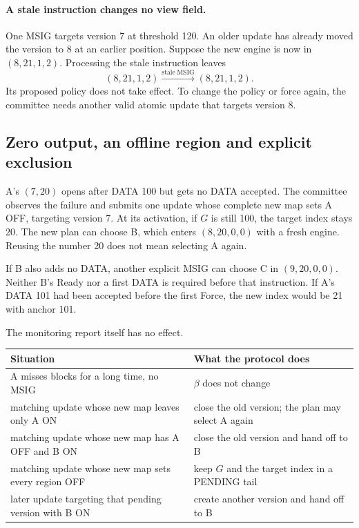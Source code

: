 \documentclass[11pt,a4paper]{article}
\newcounter{protocol}
\begin{document}
\paragraph{A stale instruction changes no view field.}
One MSIG targets version 7 at threshold 120. An older update has already
moved the version to 8 at an earlier position. Suppose the new
engine is now in $(8,21,1,2)$. Processing the stale instruction leaves
\[
 (8,21,1,2)\xrightarrow{\mathrm{stale\ MSIG}}(8,21,1,2).
\]
Its proposed policy does not take effect. To change the policy or force again,
the committee needs another valid atomic update that targets version 8.

\subsection{Zero output, an offline region and explicit exclusion}
\label{sec:retry-example}
A's $(7,20)$ opens after DATA 100 but gets no DATA accepted. The committee
observes the failure and submits one update whose complete new map sets
A OFF, targeting version 7. At its activation, if
$G$ is still 100, the target index stays 20. The new plan can choose B, which
enters $(8,20,0,0)$ with a fresh engine. Reusing the number 20 does not
mean selecting A again.

If B also adds no DATA, another explicit MSIG can choose C in
$(9,20,0,0)$. Neither B's Ready nor a first DATA is required before that
instruction. If A's DATA 101 had been accepted before the first Force,
the new index would be 21 with anchor 101.

The monitoring report itself has no effect.
\begin{center}\small
\begin{tabularx}{\linewidth}{@{}>{\raggedright\arraybackslash}p{.45\linewidth}Y@{}}\toprule
Situation & What the protocol does\\\midrule
A misses blocks for a long time, no MSIG & $\beta$ does not change\\
matching update whose new map leaves only A ON & close the old version; the plan may select A again\\
matching update whose new map has A OFF and B ON & close the old version and hand off to B\\
matching update whose new map sets every region OFF & keep $G$ and the target index in a PENDING tail\\
later update targeting that pending version with B ON & create another version and hand off to B\\\bottomrule
\end{tabularx}
\end{center}
\end{document}
